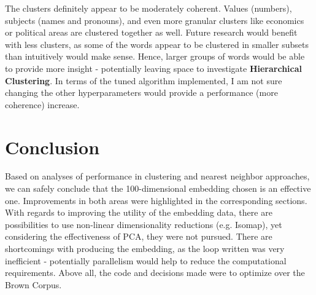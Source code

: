 \documentclass[12pt]{article}
\theoremstyle{plain}
\theoremstyle{definition}
\numberwithin{equation}{theorem}
\begin{document}
\bigskip
The clusters definitely appear to be moderately coherent. Values (numbers), subjects (names and pronouns), and even more granular clusters like economics or political areas are clustered together as well. Future research would benefit with less clusters, as some of the words appear to be clustered in smaller subsets than intuitively would make sense. Hence, larger groups of words would be able to provide more insight - potentially leaving space to investigate \textbf{Hierarchical Clustering}. In terms of the tuned algorithm implemented, I am not sure changing the other hyperparameters would provide a performance (more coherence) increase.


\section{Conclusion}

Based on analyses of performance in clustering and nearest neighbor approaches, we can safely conclude that the 100-dimensional embedding chosen is an effective one. Improvements in both areas were highlighted in the corresponding sections. With regards to improving the utility of the embedding data, there are possibilities to use non-linear dimensionality reductions (e.g. Isomap), yet considering the effectiveness of PCA, they were not pursued. There are shortcomings with producing the embedding, as the loop written was very inefficient - potentially parallelism would help to reduce the computational requirements. Above all, the code and decisions made were to optimize over the Brown Corpus.
\end{document}
